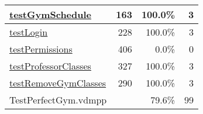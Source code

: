 \begin{longtable}{|l|r|r|r|}
\hline
\hyperref[testGymSchedule:163]{testGymSchedule} & 163&100.0\% & 3 \\
\hline
\hyperref[testLogin:228]{testLogin} & 228&100.0\% & 3 \\
\hline
\hyperref[testPermissions:406]{testPermissions} & 406&0.0\% & 0 \\
\hline
\hyperref[testProfessorClasses:327]{testProfessorClasses} & 327&100.0\% & 3 \\
\hline
\hyperref[testRemoveGymClasses:290]{testRemoveGymClasses} & 290&100.0\% & 3 \\
\hline
\hline
TestPerfectGym.vdmpp & & 79.6\% & 99 \\
\hline
\end{longtable}


